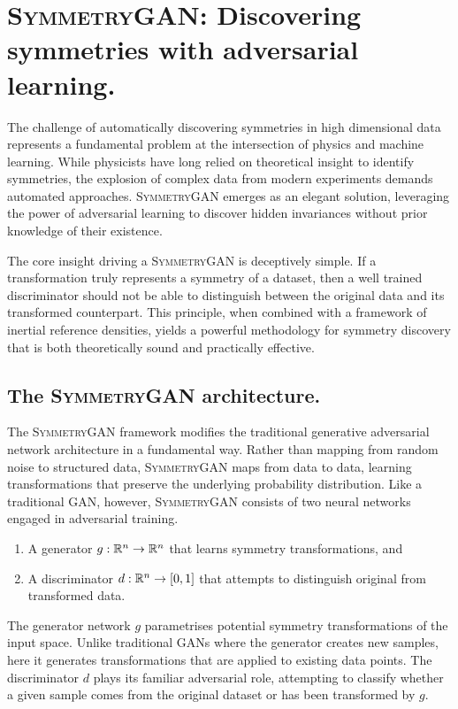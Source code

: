 \section{\textsc{SymmetryGAN}: Discovering symmetries with adversarial learning.}
\label{sec:symmetry-gan-main}
\sectionminitoc
The challenge of automatically discovering symmetries in high dimensional data represents a fundamental problem at the intersection of physics and machine learning.
%
While physicists have long relied on theoretical insight to identify symmetries, the explosion of complex data from modern experiments demands automated approaches.
%
\textsc{SymmetryGAN} emerges as an elegant solution, leveraging the power of adversarial learning to discover hidden invariances without prior knowledge of their existence.

The core insight driving a \textsc{SymmetryGAN} is deceptively simple.
%
If a transformation truly represents a symmetry of a dataset, then a well trained discriminator should not be able to distinguish between the original data and its transformed counterpart.
%
This principle, when combined with a framework of inertial reference densities, yields a powerful methodology for symmetry discovery that is both theoretically sound and practically effective.
    \subsection{The \textsc{SymmetryGAN} architecture.}
    The \textsc{SymmetryGAN} framework modifies the traditional generative adversarial network architecture in a fundamental way.
    Rather than mapping from random noise to structured data, \textsc{SymmetryGAN} maps from data to data, learning transformations that preserve the underlying probability distribution.
    Like a traditional GAN, however, \textsc{SymmetryGAN} consists of two neural networks engaged in adversarial training.
    \begin{enumerate}
        \item A generator \(g: \mathbb{R}^n \to \mathbb{R}^n\) that learns symmetry transformations, and
        \item A discriminator \(d: \mathbb{R}^n \to [0, 1]\) that attempts to distinguish original from transformed data.
    \end{enumerate}
    The generator network \(g\) parametrises potential symmetry transformations of the input space.
    Unlike traditional GANs where the generator creates new samples, here it generates transformations that are applied to existing data points.
    The discriminator \(d\) plays its familiar adversarial role, attempting to classify whether a given sample comes from the original dataset or has been transformed by \(g\).

